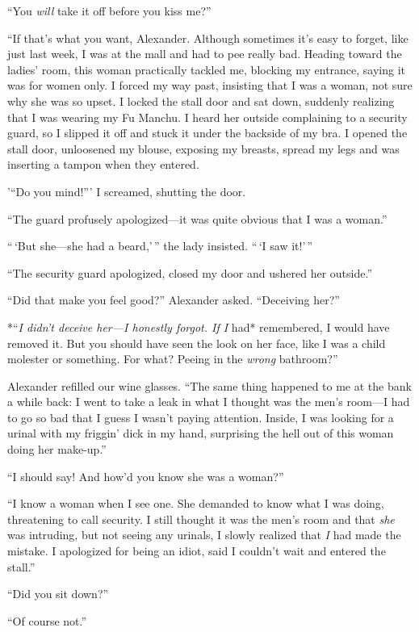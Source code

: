 ``You \emph{will} take it off before you kiss me?''

``If that's what you want, Alexander. Although sometimes it's easy to
forget, like just last week, I was at the mall and had to pee really
bad. Heading toward the ladies' room, this woman practically tackled me,
blocking my entrance, saying it was for women only. I forced my way
past, insisting that I was a woman, not sure why she was so upset. I
locked the stall door and sat down, suddenly realizing that I was
wearing my Fu Manchu. I heard her outside complaining to a security
guard, so I slipped it off and stuck it under the backside of my bra. I
opened the stall door, unloosened my blouse, exposing my breasts, spread
my legs and was inserting a tampon when they entered.

'``Do you mind!''' I screamed, shutting the door.

``The guard profusely apologized---it was quite obvious that I was a
woman.''

``\,`But she---she had a beard,'\,'' the lady insisted. ``\,`I saw
it!'\,''

``The security guard apologized, closed my door and ushered her
outside.''

``Did that make you feel good?'' Alexander asked. ``Deceiving her?''

*``\emph{I didn't deceive her---I honestly forgot. If I }had*
remembered, I would have removed it. But you should have seen the look
on her face, like I was a child molester or something. For what? Peeing
in the \emph{wrong} bathroom?''

Alexander refilled our wine glasses. ``The same thing happened to me at
the bank a while back: I went to take a leak in what I thought was the
men's room---I had to go so bad that I guess I wasn't paying attention.
Inside, I was looking for a urinal with my friggin' dick in my hand,
surprising the hell out of this woman doing her make-up.''

``I should say! And how'd you know she was a woman?''

``I know a woman when I see one. She demanded to know what I was doing,
threatening to call security. I still thought it was the men's room and
that \emph{she} was intruding, but not seeing any urinals, I slowly
realized that \emph{I} had made the mistake. I apologized for being an
idiot, said I couldn't wait and entered the stall.''

``Did you sit down?''

``Of course not.''

